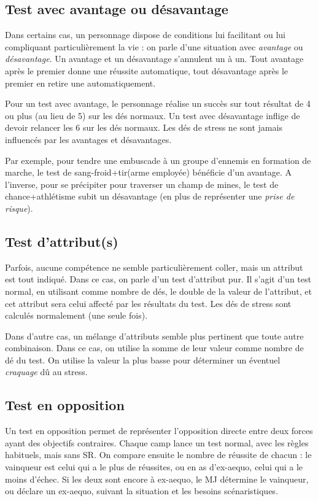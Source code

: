 \documentclass{report}
\begin{document}
\begin{multicols}{2}
\subsection{Test avec avantage ou désavantage}
Dans certains cas, un personnage dispose de conditions lui facilitant ou lui compliquant particulièrement la vie : on parle d'une situation avec \emph{avantage} ou \emph{désavantage}. Un avantage et un désavantage s'annulent un à un. Tout avantage après le premier donne une réussite automatique, tout désavantage après le premier en retire une automatiquement.

Pour un test avec avantage, le personnage réalise un succès sur tout résultat de 4 ou plus (au lieu de 5) sur les dés normaux. Un test avec désavantage inflige de devoir relancer les 6 sur les dés normaux. Les dés de stress ne sont jamais influencés par les avantages et désavantages.

Par exemple, pour tendre une embuscade à un groupe d'ennemis en formation de marche, le test de sang-froid+tir(arme employée) bénéficie d'un avantage. A l'inverse, pour se précipiter pour traverser un champ de mines, le test de chance+athlétisme subit un désavantage (en plus de représenter une \emph{prise de risque}).

\subsection{Test d'attribut(s)}
Parfois, aucune compétence ne semble particulièrement coller, mais un attribut est tout indiqué. Dans ce cas, on parle d'un test d'attribut pur. Il s'agit d'un test normal, en utilisant comme nombre de dés, le double de la valeur de l'attribut, et cet attribut sera celui affecté par les résultats du test. Les dés de stress sont calculés normalement (une seule fois).

Dans d'autre cas, un mélange d'attributs semble plus pertinent que toute autre combinaison. Dans ce cas, on utilise la somme de leur valeur comme nombre de dé du test. On utilise la valeur la plus basse pour déterminer un éventuel \emph{craquage} dû au stress.


\subsection{Test en opposition}
Un test en opposition permet de représenter l'opposition directe entre deux forces ayant des objectifs contraires. Chaque camp lance un test normal, avec les règles habituels, mais sans SR. On compare ensuite le nombre de réussite de chacun : le vainqueur est celui qui a le plus de réussites, ou en as d'ex-aequo, celui qui a le moins d'échec. Si les deux sont encore à ex-aequo, le MJ détermine le vainqueur, ou déclare un ex-aequo, suivant la situation et les besoins scénaristiques.

\end{multicols}
\end{document}
